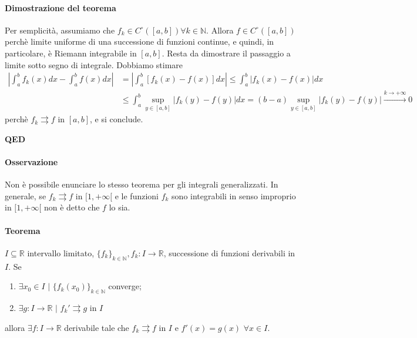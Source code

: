 \documentclass{article}
\newcommand{\R}{\mathbb{R}}
\newcommand{\N}{\mathbb{N}}
\begin{document}
\paragraph{{Dimostrazione del teorema}}
Per semplicità, assumiamo che $f_k \in C^\circ([a,b])\forall k \in \N$. Allora $f\in C^\circ([a,b])$ perchè limite uniforme di una successione di funzioni continue, e quindi, in particolare, è Riemann integrabile in $[a,b]$. Resta da dimostrare il passaggio a limite sotto segno di integrale. Dobbiamo stimare 
\begin{align*}
    |\int_{a}^{b}f_k(x) dx -\int_{a}^{b}f(x)dx|&=|\int_{a}^{b} [f_k(x)-f(x)]dx|\leq \int_{a}^{b}|f_k(x)-f(x)|dx\\ &\leq \int_{a}^{b}\sup_{y \in [a,b]} |f_k(y)-f(y)|dx= (b-a)\sup_{y \in [a,b]} |f_k(y)-f(y)| \xrightarrow{k \rightarrow+\infty} 0
\end{align*}
perchè $f_k \rightrightarrows f$ in $[a,b]$, e si conclude.
\begin{flushright}
\textbf{QED}
\end{flushright}

\paragraph{{Osservazione}}
Non è possibile enunciare lo stesso teorema per gli integrali generalizzati. In generale, se $f_k \rightrightarrows f$ in $[1,+\infty[$ e le funzioni $f_k$ sono integrabili in senso improprio in $[1,+\infty[$ non è detto che $f$ lo sia.

\paragraph{Teorema}
$I \subseteq \R$ intervallo limitato, $\{f_k\}_{k \in \N}, f_k: I \rightarrow \R$, successione di funzioni derivabili in $I$. Se 
\begin{enumerate}
    \item $\exists x_0 \in I\,\, |\,\, \{f_k(x_0)\}_{k \in \N} $ converge;
    \item $\exists g:I \rightarrow \R \,\, |\,\, f_k' \rightrightarrows g$ in $I$
\end{enumerate}
allora $\exists f: I \rightarrow \R$ derivabile tale che $f_k\rightrightarrows f$ in $I$ e $f' (x)= g(x) \,\, \forall x \in I$.
\end{document}
